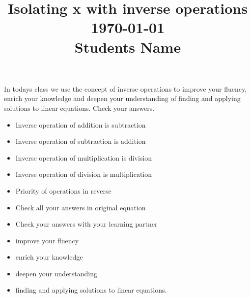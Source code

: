 \documentclass[12pt, a4paper, addpoints]{exam}
\title{\large Isolating x with inverse operations    \\ \dayofweekname{\day}{\month}{\year} \today \\\vspace{2mm} \quad  Students Name \underline{\hspace{8cm}}}
\date{}
\begin{document}
\thispagestyle{empty} 

\maketitle

\LARGE 

\noindent 
In todays class we use the concept of inverse operations  to improve your fluency, enrich  your knowledge and deepen your understanding of finding and applying solutions to linear equations. Check your answers.


\begin{questions}



\begin{mdframed}[backgroundcolor=gray!10] %
\LARGE
\setlength{\columnsep}{1pt}
\thispagestyle{empty} 
\begin{itemize}
\item  Inverse operation of addition is subtraction
\item Inverse operation  of  subtraction is addition
\item Inverse operation  of multiplication is division
\item Inverse operation  of division  is multiplication
\item Priority of operations in reverse
\item Check all your answers in original equation 
\item Check your answers with your learning partner
\item improve your fluency \item  enrich  your knowledge \item  deepen your understanding  \item  finding and applying solutions to linear equations.

\end{itemize}
\end{mdframed}
\tableofcontents
\Large
\newpage
\newpage
\newpage
\newpage
\newpage
\newpage 
\newpage
\newpage
\newpage
\newpage
\newpage
\newpage
\newpage
\newpage
\newpage
\newpage
\newpage

\end{questions}
\end{document}
